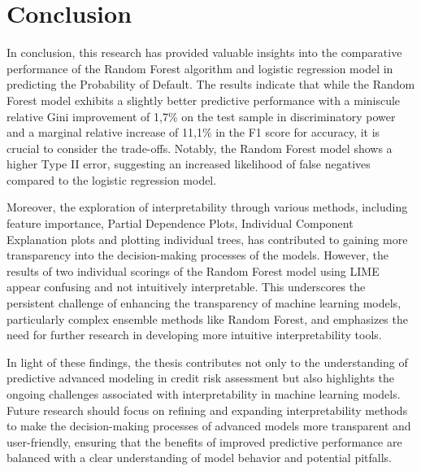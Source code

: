 \chapter{Conclusion}

In conclusion, this research has provided valuable insights into the comparative performance of the Random Forest algorithm and logistic regression model in predicting the Probability of Default. The results indicate that while the Random Forest model exhibits a slightly better predictive performance with a miniscule relative Gini improvement of 1,7\% on the test sample in discriminatory power and a marginal relative increase of 11,1\% in the F1 score for accuracy, it is crucial to consider the trade-offs. Notably, the Random Forest model shows a higher Type II error, suggesting an increased likelihood of false negatives compared to the logistic regression model.

Moreover, the exploration of interpretability through various methods, including feature importance, Partial Dependence Plots, Individual Component Explanation plots and plotting individual trees, has contributed to gaining more transparency into the decision-making processes of the models. However, the results of two individual scorings of the Random Forest model using LIME appear confusing and not intuitively interpretable. This underscores the persistent challenge of enhancing the transparency of machine learning models, particularly complex ensemble methods like Random Forest, and emphasizes the need for further research in developing more intuitive interpretability tools.

In light of these findings, the thesis contributes not only to the understanding of predictive advanced modeling in credit risk assessment but also highlights the ongoing challenges associated with interpretability in machine learning models. Future research should focus on refining and expanding interpretability methods to make the decision-making processes of advanced models more transparent and user-friendly, ensuring that the benefits of improved predictive performance are balanced with a clear understanding of model behavior and potential pitfalls.